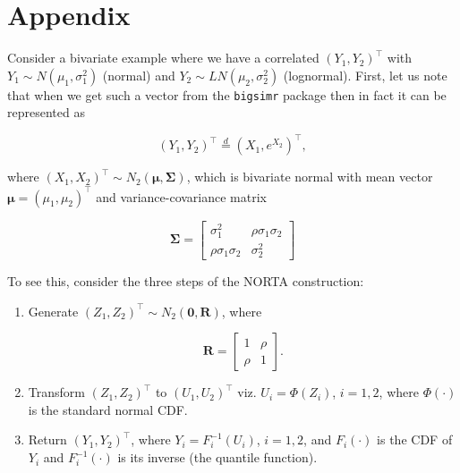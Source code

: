 \documentclass[
]{jss}
\begin{document}
\hypertarget{appendix}{%
\section*{Appendix}\label{appendix}}

\noindent Consider a bivariate example where we have a correlated \((Y_1, Y_2)^\top\) with \(Y_1\sim N(\mu_1, \sigma_1^2)\) (normal) and \(Y_2\sim LN(\mu_2, \sigma_2^2)\) (lognormal). First, let us note that when we get such a vector from the \texttt{bigsimr} package then in fact it can be represented as

\begin{equation}
(Y_1, Y_2)^\top \stackrel{d}{=} \left(X_1, e^{X_2}\right)^\top,
\label{eq:kram1}
\end{equation}

where \((X_1, X_2)^\top \sim N_2(\boldsymbol \mu, \boldsymbol \Sigma)\), which is bivariate normal with mean vector \(\boldsymbol \mu = (\mu_1, \mu_2)^\top\) and variance-covariance matrix

\begin{equation}
\boldsymbol \Sigma = 
\begin{bmatrix}
\sigma_1^2 & \rho \sigma_1\sigma_2\\
\rho \sigma_1\sigma_2 & \sigma_2^2
\end{bmatrix}
\label{eq:kram2}
\end{equation}

To see this, consider the three steps of the NORTA construction:

\begin{enumerate}

\item Generate $(Z_1, Z_2)^\top \sim N_2(\boldsymbol 0, \boldsymbol R)$, where 

\begin{equation}
\boldsymbol R = 
\left[
\begin{array}{cc}
1 & \rho \\
\rho & 1
\end{array}
\right].
\label{eq:kram3}
\end{equation}


\item Transform $(Z_1, Z_2)^\top$ to $(U_1, U_2)^\top$ viz. $U_i =\Phi(Z_i)$,  $i=1,2$, where $\Phi(\cdot)$ is the standard normal CDF. 

\item Return $(Y_1, Y_2)^\top$, where $Y_i=F_i^{-1}(U_i)$, $i=1,2$, and $F_i(\cdot)$ is the CDF of $Y_i$ and $F_i^{-1}(\cdot)$ is its inverse (the quantile function). 

\end{enumerate}
\end{document}
